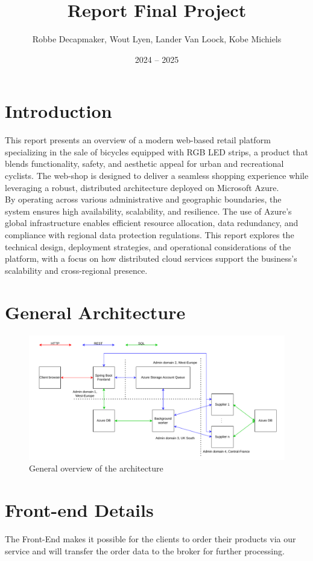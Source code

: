 \documentclass[10pt,a4paper,kul]{kulakarticle} %
\date{2024 -- 2025}
\title{Report Final Project}
\author{Robbe Decapmaker, Wout Lyen, Lander Van Loock, Kobe Michiels}
\begin{document}
	\maketitle  
	\section*{Introduction}
		This report presents an overview of a modern web-based retail platform specializing in the sale of bicycles equipped with RGB LED strips, a product that blends functionality, safety, and aesthetic appeal for urban and recreational cyclists. The web-shop is designed to deliver a seamless shopping experience while leveraging a robust, distributed architecture deployed on Microsoft Azure.\\
		By operating across various administrative and geographic boundaries, the system ensures high availability, scalability, and resilience. The use of Azure’s global infrastructure enables efficient resource allocation, data redundancy, and compliance with regional data protection regulations. This report explores the technical design, deployment strategies, and operational considerations of the platform, with a focus on how distributed cloud services support the business’s scalability and cross-regional presence.

	\section{General Architecture}
		\begin{figure}[h]
			\centering
			\includegraphics[width=1\linewidth]{images/arch}
			\caption{General overview of the architecture}
			\label{fig:arch}
		\end{figure}
		
	
	\section{Front-end Details}
	The Front-End makes it possible for the clients to order their products via our service and will transfer the order data to the broker for further processing.
	
\end{document}
